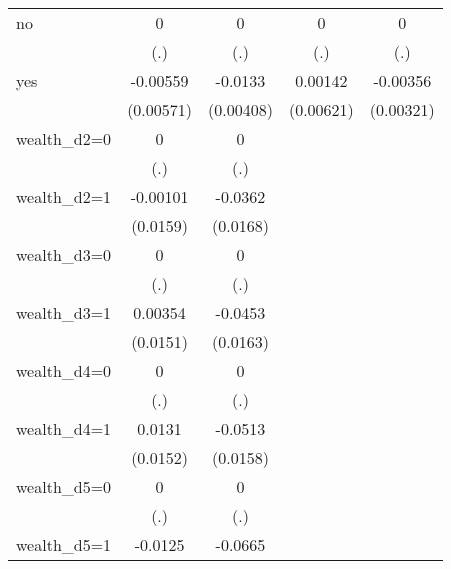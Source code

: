 \begin{table}[htbp]
\begin{tabular}{l*{4}{c}}
\addlinespace
no              &        0         &        0         &        0         &        0         \\
                &      (.)         &      (.)         &      (.)         &      (.)         \\
\addlinespace
yes             & -0.00559         &  -0.0133\sym{***}&  0.00142         & -0.00356         \\
                &(0.00571)         &(0.00408)         &(0.00621)         &(0.00321)         \\
\addlinespace
wealth\_d2=0     &        0         &        0         &                  &                  \\
                &      (.)         &      (.)         &                  &                  \\
\addlinespace
wealth\_d2=1     & -0.00101         &  -0.0362\sym{**} &                  &                  \\
                & (0.0159)         & (0.0168)         &                  &                  \\
\addlinespace
wealth\_d3=0     &        0         &        0         &                  &                  \\
                &      (.)         &      (.)         &                  &                  \\
\addlinespace
wealth\_d3=1     &  0.00354         &  -0.0453\sym{***}&                  &                  \\
                & (0.0151)         & (0.0163)         &                  &                  \\
\addlinespace
wealth\_d4=0     &        0         &        0         &                  &                  \\
                &      (.)         &      (.)         &                  &                  \\
\addlinespace
wealth\_d4=1     &   0.0131         &  -0.0513\sym{***}&                  &                  \\
                & (0.0152)         & (0.0158)         &                  &                  \\
\addlinespace
wealth\_d5=0     &        0         &        0         &                  &                  \\
                &      (.)         &      (.)         &                  &                  \\
\addlinespace
wealth\_d5=1     &  -0.0125         &  -0.0665\sym{***}&                  &                  \\

\end{tabular}
\end{table}
